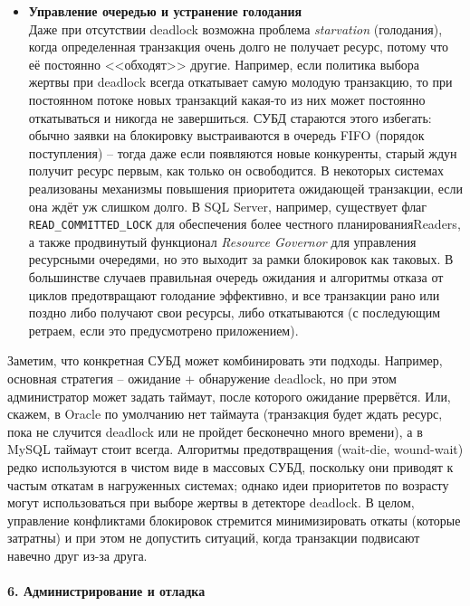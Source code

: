 \begin{itemize}
    \item \textbf{Управление очередью и устранение голодания} ~\\
    Даже при отсутствии deadlock возможна проблема \textit{starvation} (голодания), когда определенная транзакция очень долго не получает ресурс, потому что её постоянно <<обходят>> другие. Например, если политика выбора жертвы при deadlock всегда откатывает самую молодую транзакцию, то при постоянном потоке новых транзакций какая-то из них может постоянно откатываться и никогда не завершиться. СУБД стараются этого избегать: обычно заявки на блокировку выстраиваются в очередь FIFO (порядок поступления) – тогда даже если появляются новые конкуренты, старый ждун получит ресурс первым, как только он освободится. В некоторых системах реализованы механизмы повышения приоритета ожидающей транзакции, если она ждёт уж слишком долго. В SQL Server, например, существует флаг \texttt{READ\_COMMITTED\_LOCK} для обеспечения более честного планированияReaders, а также продвинутый функционал \textit{Resource Governor} для управления ресурсными очередями, но это выходит за рамки блокировок как таковых. В большинстве случаев правильная очередь ожидания и алгоритмы отказа от циклов предотвращают голодание эффективно, и все транзакции рано или поздно либо получают свои ресурсы, либо откатываются (с последующим ретраем, если это предусмотрено приложением).
 \end{itemize} 
 Заметим, что конкретная СУБД может комбинировать эти подходы. Например, основная стратегия – ожидание + обнаружение deadlock, но при этом администратор может задать таймаут, после которого ожидание прервётся. Или, скажем, в Oracle по умолчанию нет таймаута (транзакция будет ждать ресурс, пока не случится deadlock или не пройдет бесконечно много времени), а в MySQL таймаут стоит всегда. Алгоритмы предотвращения (wait-die, wound-wait) редко используются в чистом виде в массовых СУБД, поскольку они приводят к частым откатам в нагруженных системах; однако идеи приоритетов по возрасту могут использоваться при выборе жертвы в детекторе deadlock. В целом, управление конфликтами блокировок стремится минимизировать откаты (которые затратны) и при этом не допустить ситуаций, когда транзакции подвисают навечно друг из-за друга.

\paragraph{6. Администрирование и отладка} ~\\

